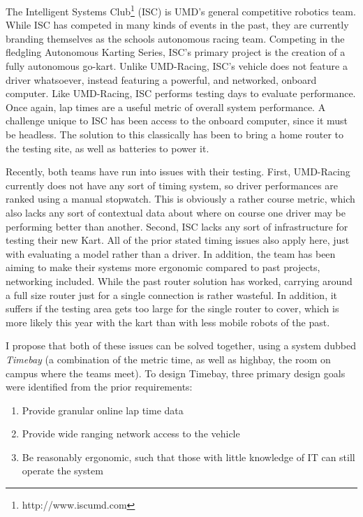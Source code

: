 \documentclass[journal]{IEEEtran}
\begin{document}
The Intelligent Systems Club\footnote{http://www.iscumd.com} (ISC) is UMD's general competitive robotics team. While ISC has competed in many kinds of events in the past, they are currently branding themselves as the schools autonomous racing team. Competing in the fledgling Autonomous Karting Series, ISC's primary project is the creation of a fully autonomous go-kart. Unlike UMD-Racing, ISC's vehicle does not feature a driver whatsoever, instead featuring a powerful, and networked, onboard computer. Like UMD-Racing, ISC performs testing days to evaluate performance. Once again, lap times are a useful metric of overall system performance. A challenge unique to ISC has been access to the onboard computer, since it must be headless. The solution to this classically has been to bring a home router to the testing site, as well as batteries to power it. 

Recently, both teams have run into issues with their testing. First, UMD-Racing currently does not have any sort of timing system, so driver performances are ranked using a manual stopwatch. This is obviously a rather course metric, which also lacks any sort of contextual data about where on course one driver may be performing better than another. Second, ISC lacks any sort of infrastructure for testing their new Kart. All of the prior stated timing issues also apply here, just with evaluating a model rather than a driver. In addition, the team has been aiming to make their systems more ergonomic compared to past projects, networking included. While the past router solution has worked, carrying around a full size router just for a single connection is rather wasteful. In addition, it suffers if the testing area gets too large for the single router to cover, which is more likely this year with the kart than with less mobile robots of the past.

I propose that both of these issues can be solved together, using a system dubbed \textit{Timebay} (a combination of the metric time, as well as highbay, the room on campus where the teams meet). To design Timebay, three primary design goals were identified from the prior requirements:
\begin{enumerate}
    \item Provide granular online lap time data
    \item Provide wide ranging network access to the vehicle
    \item Be reasonably ergonomic, such that those with little knowledge of IT can still operate the system
\end{enumerate}
\end{document}
